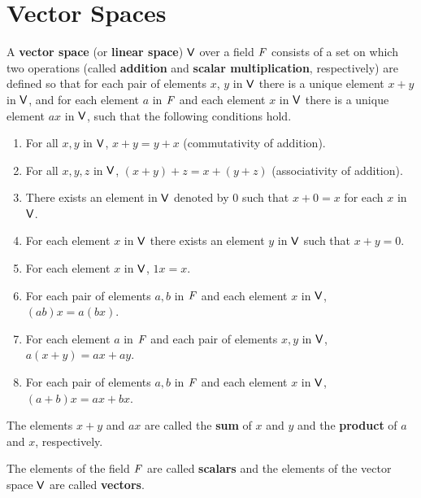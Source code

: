\section{Vector Spaces}\label{sec:1.2}

\begin{defn}\label{1.2.1}
	A \textbf{vector space} (or \textbf{linear space}) \(\mathsf{V}\) over a field \(\mathit{F}\) consists of a set on which two operations (called \textbf{addition} and \textbf{scalar multiplication}, respectively) are defined so that for each pair of elements \(x\), \(y\) in \(\mathsf{V}\) there is a unique element \(x + y\) in \(\mathsf{V}\), and for each element \(a\) in \(\mathit{F}\) and each element \(x\) in \(\mathsf{V}\) there is a unique element \(ax\) in \(\mathsf{V}\), such that the following conditions hold.
	\begin{enumerate}[label=(VS \arabic*), ref=VS \arabic*]
		\item\label{vs1}
		For all \(x, y\) in \(\mathsf{V}\), \(x + y = y + x\)
		(commutativity of addition).
		\item\label{vs2}
		For all \(x, y, z\) in \(\mathsf{V}\), \((x + y) + z = x + (y + z)\)
		(associativity of addition).
		\item\label{vs3}
		There exists an element in \(\mathsf{V}\) denoted by \(0\) such that \(x + 0 = x\) for each \(x\) in \(\mathsf{V}\).
		\item\label{vs4}
		For each element \(x\) in \(\mathsf{V}\) there exists an element \(y\) in \(\mathsf{V}\) such that \(x + y = 0\).
		\item\label{vs5}
		For each element \(x\) in \(\mathsf{V}\), \(1x = x\).
		\item\label{vs6}
		For each pair of elements \(a, b\) in \(\mathit{F}\) and each element \(x\) in \(\mathsf{V}\), \((ab) x = a (bx)\).
		\item\label{vs7}
		For each element \(a\) in \(\mathit{F}\) and each pair of elements \(x, y\) in \(\mathsf{V}\), \(a (x + y) = ax + ay\).
		\item\label{vs8}
		For each pair of elements \(a, b\) in \(\mathit{F}\) and each element \(x\) in \(\mathsf{V}\), \((a + b) x = ax + bx\).
	\end{enumerate}
	The elements \(x + y\) and \(ax\) are called the \textbf{sum} of \(x\) and \(y\) and the \textbf{product} of \(a\) and \(x\), respectively.
\end{defn}

\begin{defn}\label{1.2.2}
	The elements of the field \(\mathit{F}\) are called \textbf{scalars} and the elements of the vector space \(\mathsf{V}\) are called \textbf{vectors}.
\end{defn}


